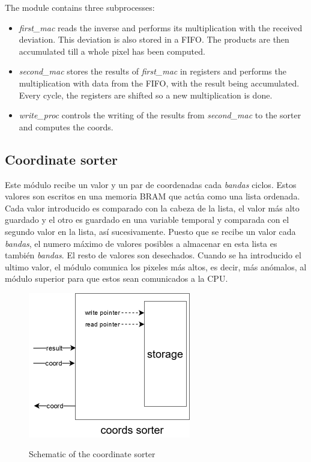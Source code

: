 The module contains three subprocesses:
\begin{itemize}
	\item \emph{first\_mac} reads the inverse and performs its multiplication with the received deviation. This deviation is also stored in a FIFO. The products are then accumulated till a whole pixel has been computed.
	\item \emph{second\_mac} stores the results of \emph{first\_mac} in registers and performs the multiplication with data from the FIFO, with the result being accumulated. Every cycle, the registers are shifted so a new multiplication is done.
	\item \emph{write\_proc} controls the writing of the results from \emph{second\_mac} to the sorter and computes the coords.
\end{itemize}



\subsection{Coordinate sorter}
Este módulo recibe un valor y un par de coordenadas cada \textit{bandas} ciclos. Estos valores son escritos en una memoria BRAM que actúa como una lista ordenada. Cada valor introducido es comparado con la cabeza de la lista, el valor más alto guardado y el otro es guardado en una variable temporal y comparada con el segundo valor en la lista, así sucesivamente. Puesto que se recibe un valor cada \textit{bandas}, el numero máximo de valores posibles a almacenar en esta lista es también \textit{bandas}. El resto de valores son desechados. Cuando se ha introducido el ultimo valor, el módulo comunica los pixeles más altos, es decir, más anómalos, al módulo superior para que estos sean comunicados a la CPU.

\begin{figure}[h!]
\centering\textbf{
\includegraphics[height=2.5in]{figures/sort.png}}
\caption{Schematic of the coordinate sorter}
  \label{fig:sorter}
\end{figure}
